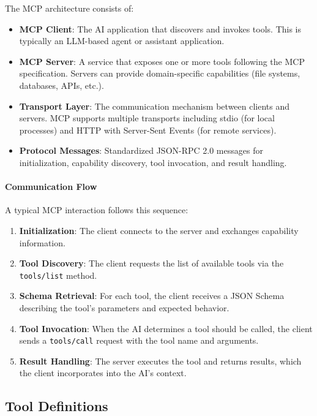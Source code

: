\documentclass[a4paper,twoside]{sapthesis}
\begin{document}
The MCP architecture consists of:

\begin{itemize}
    \item \textbf{MCP Client}: The AI application that discovers and invokes tools. This is typically an LLM-based agent or assistant application.
    
    \item \textbf{MCP Server}: A service that exposes one or more tools following the MCP specification. Servers can provide domain-specific capabilities (file systems, databases, APIs, etc.).
    
    \item \textbf{Transport Layer}: The communication mechanism between clients and servers. MCP supports multiple transports including stdio (for local processes) and HTTP with Server-Sent Events (for remote services).
    
    \item \textbf{Protocol Messages}: Standardized JSON-RPC 2.0 messages for initialization, capability discovery, tool invocation, and result handling.
\end{itemize}

\paragraph{Communication Flow}

A typical MCP interaction follows this sequence:

\begin{enumerate}
    \item \textbf{Initialization}: The client connects to the server and exchanges capability information.
    \item \textbf{Tool Discovery}: The client requests the list of available tools via the \texttt{tools/list} method.
    \item \textbf{Schema Retrieval}: For each tool, the client receives a JSON Schema describing the tool's parameters and expected behavior.
    \item \textbf{Tool Invocation}: When the AI determines a tool should be called, the client sends a \texttt{tools/call} request with the tool name and arguments.
    \item \textbf{Result Handling}: The server executes the tool and returns results, which the client incorporates into the AI's context.
\end{enumerate}

\subsection{Tool Definitions}
\end{document}
